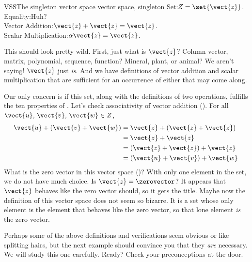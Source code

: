 \begin{example}{VSS}{The singleton vector space }{vector space, singleton}
Set:\quad $Z=\set{\vect{z}}$.\\
Equality:\quad Huh?\\
Vector Addition:\quad  $\vect{z}+\vect{z}=\vect{z}$.\\
Scalar Multiplication:\quad $\alpha\vect{z}=\vect{z}$.\par\medskip
%
This should look pretty wild.  First, just what is $\vect{z}$?  Column vector, matrix, polynomial, sequence, function?  Mineral, plant, or animal?  We aren't saying!  $\vect{z}$ just {\em is}.  And we have definitions of vector addition and scalar multiplication that are sufficient for an occurrence of either that may come along.\par
%
Our only concern is if this set, along with the definitions of two operations, fulfills the ten properties of .  Let's check associativity of vector addition ().  For all $\vect{u},\,\vect{v},\,\vect{w}\in Z$,
%
\begin{align*}
\vect{u}+(\vect{v}+\vect{w})
&=\vect{z}+(\vect{z}+\vect{z})\\
&=\vect{z}+\vect{z}\\
&=(\vect{z}+\vect{z})+\vect{z}\\
&=(\vect{u}+\vect{v})+\vect{w}
\end{align*}
%
What is the zero vector in this vector space ()?  With only one element in the set, we do not have much choice.  Is $\vect{z}=\zerovector$?  It appears that $\vect{z}$ behaves like the zero vector should, so it gets the title.  Maybe now the definition of this vector space does not seem so bizarre.  It is a set whose only element is the element that behaves like the zero vector, so that lone element {\em is} the zero vector.
\end{example}
%
Perhaps some of the above definitions and verifications seem obvious or like splitting hairs, but the next example should convince you that they {\em are} necessary.  We will study this one carefully.  Ready?  Check your preconceptions at the door.
%
